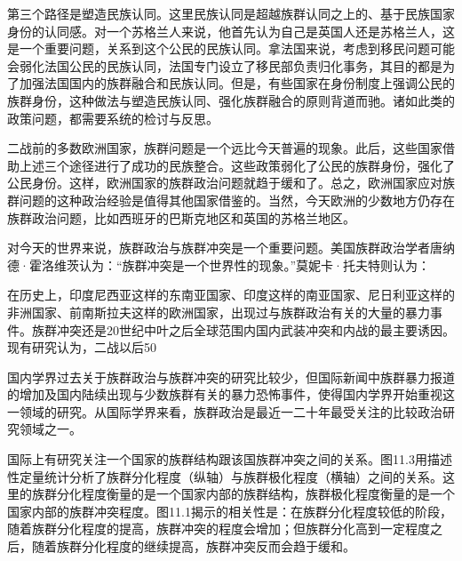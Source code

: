 第三个路径是塑造民族认同。这里民族认同是超越族群认同之上的、基于民族国家身份的认同感。对一个苏格兰人来说，他首先认为自己是英国人还是苏格兰人，这是一个重要问题，关系到这个公民的民族认同。拿法国来说，考虑到移民问题可能会弱化法国公民的民族认同，法国专门设立了移民部负责归化事务，其目的都是为了加强法国国内的族群融合和民族认同。但是，有些国家在身份制度上强调公民的族群身份，这种做法与塑造民族认同、强化族群融合的原则背道而驰。诸如此类的政策问题，都需要系统的检讨与反思。

二战前的多数欧洲国家，族群问题是一个远比今天普遍的现象。此后，这些国家借助上述三个途径进行了成功的民族整合。这些政策弱化了公民的族群身份，强化了公民身份。这样，欧洲国家的族群政治问题就趋于缓和了。总之，欧洲国家应对族群问题的这种政治经验是值得其他国家借鉴的。当然，今天欧洲的少数地方仍存在族群政治问题，比如西班牙的巴斯克地区和英国的苏格兰地区。


对今天的世界来说，族群政治与族群冲突是一个重要问题。美国族群政治学者唐纳德·霍洛维茨认为：“族群冲突是一个世界性的现象。”莫妮卡·托夫特则认为：


在历史上，印度尼西亚这样的东南亚国家、印度这样的南亚国家、尼日利亚这样的非洲国家、前南斯拉夫这样的欧洲国家，出现过与族群政治有关的大量的暴力事件。族群冲突还是20世纪中叶之后全球范围内国内武装冲突和内战的最主要诱因。现有研究认为，二战以后50%

国内学界过去关于族群政治与族群冲突的研究比较少，但国际新闻中族群暴力报道的增加及国内陆续出现与少数族群有关的暴力恐怖事件，使得国内学界开始重视这一领域的研究。从国际学界来看，族群政治是最近一二十年最受关注的比较政治研究领域之一。

国际上有研究关注一个国家的族群结构跟该国族群冲突之间的关系。图11.3用描述性定量统计分析了族群分化程度（纵轴）与族群极化程度（横轴）之间的关系。这里的族群分化程度衡量的是一个国家内部的族群结构，族群极化程度衡量的是一个国家内部的族群冲突程度。图11.1揭示的相关性是：在族群分化程度较低的阶段，随着族群分化程度的提高，族群冲突的程度会增加；但族群分化高到一定程度之后，随着族群分化程度的继续提高，族群冲突反而会趋于缓和。

